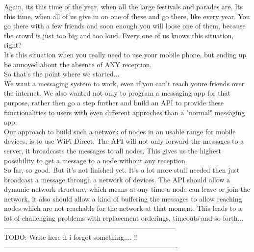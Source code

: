 Again, its this time of the year, when all the large festivals and parades are. Its this time, when all of us give in on one of these and go there, like every year. 
You go there with a few friends and soon enough you will loose one of them, because the crowd is just too big and too loud. Every one of us knows this situation, right? \\
It's this situation when you really need to use your mobile phone, but ending up be annoyed about the absence of ANY reception. \\
So that's the point where we started... \\

We want a messaging system to work, even if you can't reach youre friends over the internet. We also wanted not only to program a messaging app for that purpose, rather then go a step further and build an API to provide these functionalities to users with even different approches than a "normal" messaging app. \\

Our approach to build such a network of nodes in an usable range for mobile devices, is to use WiFi Direct. The API will not only forward the messages to a server, it broadcasts the messages to all nodes. This gives us the highest possibility to get a message to a node without any reception. \\

So far, so good. But it's not finished yet. It's a lot more stuff needed then just broadcast a message through a network of devices. The API should allow a dynamic network structure, which means at any time a node can leave or join the network, it also should allow a kind of buffering the messages to allow reaching nodes which are not reachable for the network at that moment. This leads to a lot of challenging problems with replacement orderings, timeouts and so forth... \\

---------------------------------------------------------------------------\\
TODO: Write here if i forgot something.... !! \\

----------------------------------------------------------------------------